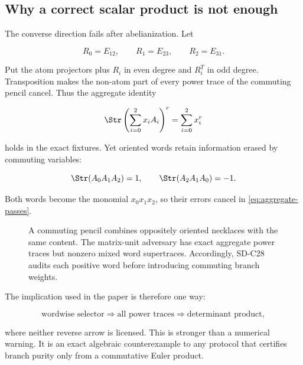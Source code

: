 \subsection{Why a correct scalar product is not enough}

The converse direction fails after abelianization.  Let

\[
 R_0=E_{12},\qquad R_1=E_{23},\qquad R_2=E_{31}.
\]

Put the atom projectors plus \(R_i\) in even degree and \(R_i^T\) in odd
degree.  Transposition makes the non-atom part of every power trace of the
commuting pencil cancel.  Thus the aggregate identity

\begin{equation}
 \Str\left(\sum_{i=0}^2x_iA_i\right)^r=\sum_{i=0}^2x_i^r
 \label{eq:aggregate-passes}
\end{equation}

holds in the exact fixtures.  Yet oriented words retain information erased by
commuting variables:

\begin{equation}
 \Str(A_0A_1A_2)=1,
 \qquad
 \Str(A_2A_1A_0)=-1.
 \label{eq:oriented-witness}
\end{equation}

Both words become the monomial \(x_0x_1x_2\), so their errors cancel in
\eqref{eq:aggregate-passes}.

\begin{figure}[t]
  \centering
  \resizebox{0.90\textwidth}{!}{}
  \caption{A commuting pencil combines oppositely oriented necklaces with
  the same content.  The matrix-unit adversary has exact aggregate power
  traces but nonzero mixed word supertraces.  Accordingly, SD-C28 audits each
  positive word before introducing commuting branch weights.}
  \label{fig:wordwise-firewall}
\end{figure}

The implication used in the paper is therefore one way:

\[
 \text{wordwise selector}
 \Longrightarrow\text{all power traces}
 \Longrightarrow\text{determinant product},
\]

where neither reverse arrow is licensed.  This is stronger than a numerical
warning.  It is an exact algebraic counterexample to any protocol that
certifies branch purity only from a commutative Euler product.

